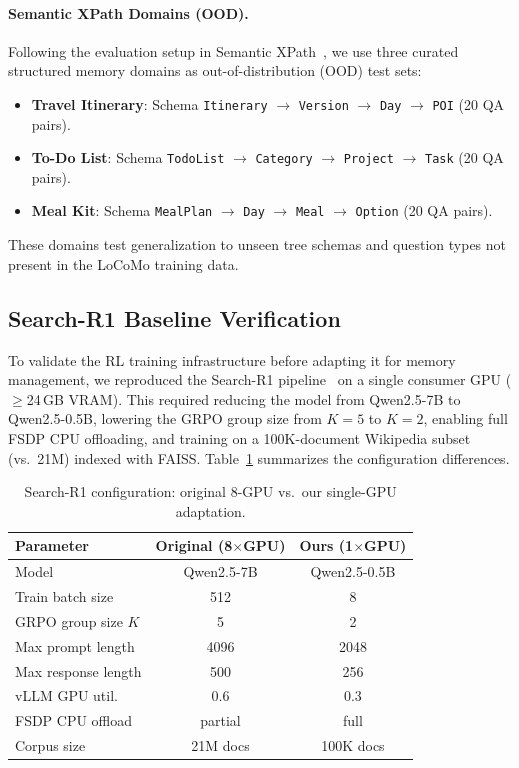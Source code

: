 \documentclass{article}
\theoremstyle{definition}
\begin{document}
\paragraph{Semantic XPath Domains (OOD).}
Following the evaluation setup in Semantic XPath~\citep{semanticxpath2026}, we use three curated structured memory domains as out-of-distribution (OOD) test sets:
\begin{itemize}[nosep]
    \item \textbf{Travel Itinerary}: Schema \texttt{Itinerary} $\to$ \texttt{Version} $\to$ \texttt{Day} $\to$ \texttt{POI} (20 QA pairs).
    \item \textbf{To-Do List}: Schema \texttt{TodoList} $\to$ \texttt{Category} $\to$ \texttt{Project} $\to$ \texttt{Task} (20 QA pairs).
    \item \textbf{Meal Kit}: Schema \texttt{MealPlan} $\to$ \texttt{Day} $\to$ \texttt{Meal} $\to$ \texttt{Option} (20 QA pairs).
\end{itemize}
These domains test generalization to unseen tree schemas and question types not present in the LoCoMo training data.



\subsection{Search-R1 Baseline Verification}

To validate the RL training infrastructure before adapting it for memory management, we reproduced the Search-R1 pipeline~\citep{jin2025search} on a single consumer GPU ($\geq$24\,GB VRAM). This required reducing the model from Qwen2.5-7B to Qwen2.5-0.5B, lowering the GRPO group size from $K{=}5$ to $K{=}2$, enabling full FSDP CPU offloading, and training on a 100K-document Wikipedia subset (vs.\ 21M) indexed with FAISS. Table~\ref{tab:config} summarizes the configuration differences.

\begin{table}[h]
\centering
\caption{Search-R1 configuration: original 8-GPU vs.\ our single-GPU adaptation.}
\label{tab:config}
\small
\begin{tabular}{lcc}
\toprule
\textbf{Parameter} & \textbf{Original (8$\times$GPU)} & \textbf{Ours (1$\times$GPU)} \\
\midrule
Model & Qwen2.5-7B & Qwen2.5-0.5B \\
Train batch size & 512 & 8 \\
GRPO group size $K$ & 5 & 2 \\
Max prompt length & 4096 & 2048 \\
Max response length & 500 & 256 \\
vLLM GPU util. & 0.6 & 0.3 \\
FSDP CPU offload & partial & full \\
Corpus size & 21M docs & 100K docs \\
\bottomrule
\end{tabular}
\end{table}
\end{document}
